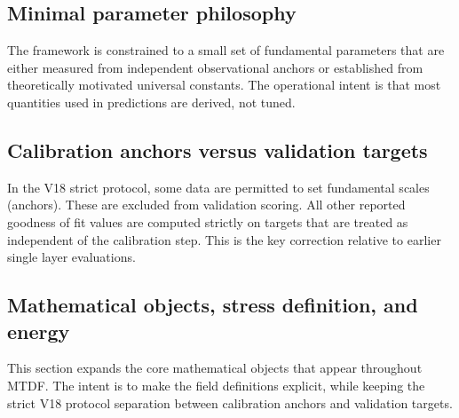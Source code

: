 \documentclass[11pt,a4paper]{article}
\begin{document}
\subsection{Minimal parameter philosophy}
The framework is constrained to a small set of fundamental parameters that are either measured from independent observational anchors or established from theoretically motivated universal constants. The operational intent is that most quantities used in predictions are derived, not tuned.

\subsection{Calibration anchors versus validation targets}
In the V18 strict protocol, some data are permitted to set fundamental scales (anchors). These are excluded from validation scoring. All other reported goodness of fit values are computed strictly on targets that are treated as independent of the calibration step. This is the key correction relative to earlier single layer evaluations.

\subsection{Mathematical objects, stress definition, and energy}
This section expands the core mathematical objects that appear throughout MTDF. The intent is to make the field definitions explicit, while keeping the strict V18 protocol separation between calibration anchors and validation targets.
\end{document}

